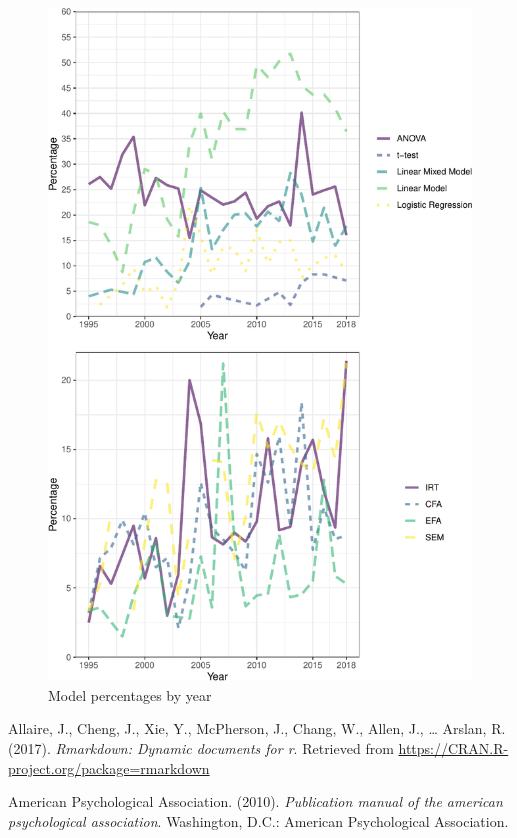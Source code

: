 \documentclass[english,,man]{apa6}
\theoremstyle{definition}
\theoremstyle{definition}
\theoremstyle{definition}
\theoremstyle{remark}
\begin{document}
\begin{figure}
\centering
\includegraphics{software_files/figure-latex/model-year-at1-1.pdf}
\caption{\label{fig:model-year-at1}Model percentages by year}
\end{figure}

\hypertarget{refs}{}
\leavevmode\hypertarget{ref-rmarkdown}{}%
Allaire, J., Cheng, J., Xie, Y., McPherson, J., Chang, W., Allen, J.,
\ldots{} Arslan, R. (2017). \emph{Rmarkdown: Dynamic documents for r}.
Retrieved from \url{https://CRAN.R-project.org/package=rmarkdown}

\leavevmode\hypertarget{ref-apa}{}%
American Psychological Association. (2010). \emph{Publication manual of
the american psychological association}. Washington, D.C.: American
Psychological Association.
\end{document}
